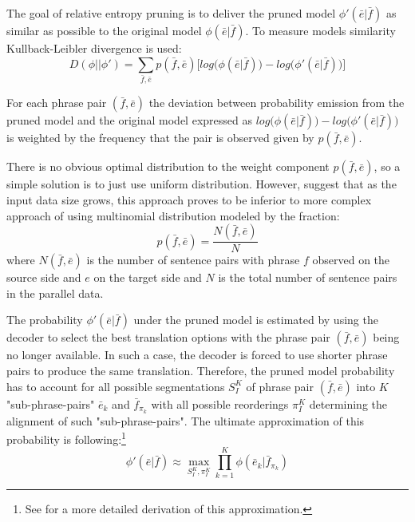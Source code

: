 The goal of relative entropy pruning is to deliver the pruned model $\phi'(\bar{e}|\bar{f})$
as similar as possible to the original model $\phi(\bar{e}|\bar{f})$.
To measure models similarity Kullback-Leibler divergence is used:
\begin{equation}
  D(\phi||\phi') = \sum_{\bar{f},\bar{e}}{p(\bar{f},\bar{e}) \Big[log\big(\phi(\bar{e}|\bar{f})\big) - log\big(\phi'(\bar{e}|\bar{f})\big)\Big]}
\end{equation}

For each phrase pair $(\bar{f},\bar{e})$ the deviation between probability emission
from the pruned model and the original model expressed as
$log\big(\phi(\bar{e}|\bar{f})\big) - log\big(\phi'(\bar{e}|\bar{f})\big)$ is weighted
by the frequency that the pair is observed given by $p(\bar{f}, \bar{e})$.

There is no obvious optimal distribution to the weight component $p(\bar{f}, \bar{e})$,
so a simple solution is to just use uniform distribution.
However, \citet{ling:relentfilter} suggest that as the input data size grows, this
approach proves to be inferior to more complex approach of using multinomial distribution
modeled by the fraction:
\begin{equation}
  p(\bar{f}, \bar{e}) = \frac{N(\bar{f},\bar{e})}{N}
\end{equation}
where $N(\bar{f},\bar{e})$ is the number of sentence pairs with phrase $f$ observed on the
source side and $e$ on the target side and $N$ is the total number of sentence pairs
in the parallel data.

The probability $\phi'(\bar{e}|\bar{f})$ under the pruned model is estimated by using the
decoder to select the best translation options with the phrase pair $(\bar{f},\bar{e})$
being no longer available.
In such a case, the decoder is forced to use shorter phrase pairs to produce the same
translation.
Therefore, the pruned model probability has to account for all possible segmentations
$S_I^K$ of phrase pair $(\bar{f},\bar{e})$ into $K$ "sub-phrase-pairs"
$\bar{e}_k$ and $\bar{f}_{\pi_k}$ with all possible reorderings $\pi_I^K$ determining
the alignment of such "sub-phrase-pairs".
The ultimate approximation of this probability is following:\footnote{See
\citet{zens:systcomp} for a more detailed derivation of this approximation.}
\begin{equation}
  \phi'(\bar{e}|\bar{f}) \approx \max_{S_I^K,\pi_I^K}{\prod_{k=1}^{K} \phi(\bar{e}_k|\bar{f}_{\pi_k})}
\end{equation}

